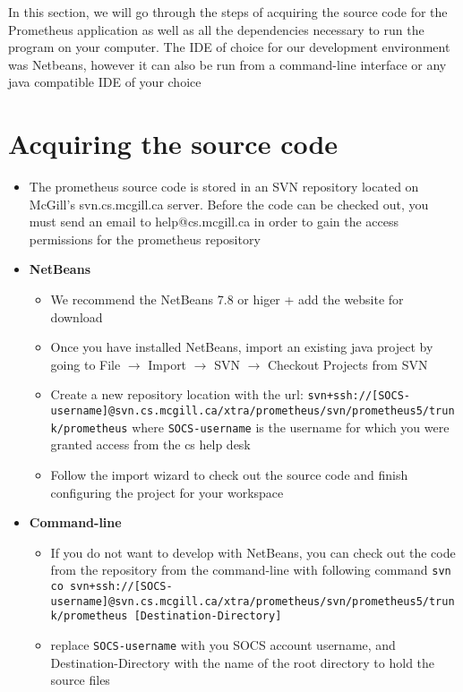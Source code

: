 \documentclass[12pt]{article}
\begin{document}
\maketitle


In this section, we will go through the steps of acquiring the source code for the Prometheus application as well as all the dependencies necessary to run the program on your computer. The IDE of choice for our development environment was Netbeans, however it can also be run from a command-line interface or any java compatible IDE of your choice

\section{Acquiring the source code}
\begin{itemize}
\item The prometheus source code is stored in an SVN repository located on McGill’s svn.cs.mcgill.ca server. Before the code can be checked out, you must send an email to help@cs.mcgill.ca in order to gain the access permissions for the prometheus repository
\item {\bf NetBeans} \\
	\begin{itemize}
	\item We recommend the NetBeans 7.8 or higer + add the website for download
	\item Once you have installed NetBeans, import an existing java project by going to File $\rightarrow$ Import $\rightarrow$ SVN $\rightarrow$ Checkout Projects from SVN
	\item Create a new repository location with the url: {\tt svn+ssh://[SOCS-username]@svn.cs.mcgill.ca/xtra/prometheus/svn/prometheus5/trunk/prometheus} where {\tt SOCS-username} is the username for which you were granted access from the cs help desk
	\item Follow the import wizard to check out the source code and finish configuring the project for your workspace
	\end{itemize}
\item {\bf Command-line}\\
	\begin{itemize}
	\item If you do not want to develop with NetBeans, you can check out the code from the repository from the command-line with following command {\tt svn co svn+ssh://[SOCS-username]@svn.cs.mcgill.ca/xtra/prometheus/svn/prometheus5/trunk/prometheus [Destination-Directory]}
	\item replace {\tt SOCS-username} with you SOCS account username, and Destination-Directory with the name of the root directory to hold the source files
	\end{itemize}

\end{itemize}
\end{document}
